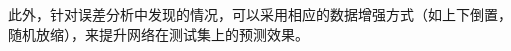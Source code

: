 \documentclass[10.5pt,twocolumn]{jbuaa}
\begin{document}
此外，针对误差分析中发现的情况，可以采用相应的数据增强方式（如上下倒置，随机放缩），来提升网络在测试集上的预测效果。



\renewcommand\refname{\hei\wuhao\centerline{参考文献（References）}\global\def\refname{参考文献}}
\vskip 12pt

\let\OLDthebibliography\thebibliography
\renewcommand\thebibliography[1]{
 \OLDthebibliography{#1}
 \setlength{\parskip}{0pt}
 \setlength{\itemsep}{0pt plus 0.3ex}
}

{
\renewcommand{\baselinestretch}{0.9}
\liuhao


}


\clearpage
\newpage
\pagestyle{fancy}
\fancyhf{}
\lhead{}
\rhead{}
\lfoot{}
\cfoot{}
\rfoot{}
\renewcommand{\headrule}{%
\hrule height0.4pt width \headwidth \vskip1.0pt%
\hrule height0.4pt width \headwidth \vskip-2pt}
\end{document}
